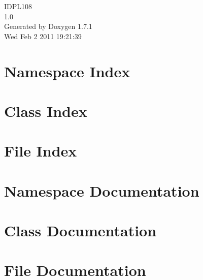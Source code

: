 \documentclass[a4paper]{book}
\begin{document}
\hypersetup{pageanchor=false}
\begin{titlepage}
\vspace*{7cm}
\begin{center}
{\Large IDPL108 \\[1ex]\large 1.0 }\\
\vspace*{1cm}
{\large Generated by Doxygen 1.7.1}\\
\vspace*{0.5cm}
{\small Wed Feb 2 2011 19:21:39}\\
\end{center}
\end{titlepage}
\clearemptydoublepage
{}
\tableofcontents
\clearemptydoublepage
{}
\hypersetup{pageanchor=true}
\chapter{Namespace Index}

\chapter{Class Index}

\chapter{File Index}

\chapter{Namespace Documentation}

\chapter{Class Documentation}








\chapter{File Documentation}















\printindex
\end{document}
